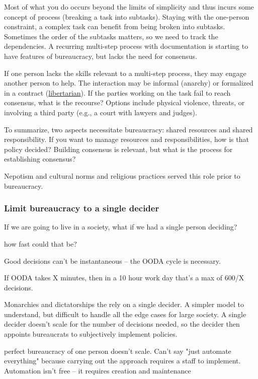 Most of what you do occurs beyond the limits of simplicity and thus incurs some concept of \gls{process} (breaking a task into subtasks). Staying with the one-person constraint, a complex task can benefit from being broken into subtasks. Sometimes the order of the subtasks matters, so we need to track the dependencies. A recurring multi-step process with documentation is starting to have features of bureaucracy, but lacks the need for consensus. 


If one person lacks the skills relevant to a multi-step process, they may engage another person to help. The interaction may be informal (anarchy) or formalized in a contract (\href{https://en.wikipedia.org/wiki/Libertarianism}{libertarian}). If the parties working on the task fail to reach consensus, what is the recourse? Options include physical violence, threats, or involving a third party (e.g., a court with lawyers and judges). 


To summarize, two aspects necessitate bureaucracy: shared resources and shared responsibility. 
If you want to manage resources and responsibilities, how is that policy decided?  Building consensus is relevant, but what is the process for establishing consensus?

Nepotism and cultural norms and religious practices served this role prior to bureaucracy. 


\subsubsection{Limit bureaucracy to a single decider}
If we are going to live in a society, what if we had a single person deciding?

how fast could that be?

Good decisions can't be instantaneous -- the OODA cycle is necessary.

If OODA takes X minutes, then in a 10 hour work day that's a max of 600/X decisions.



Monarchies and dictatorships the rely on a single decider. A simpler model to understand, but difficult to handle all the edge cases for large society. A single decider doesn't scale for the number of decisions needed, so the decider then appoints bureaucrats to subjectively implement policies. 


perfect bureaucracy of one person doesn't scale. Can't say "just automate everything" because carrying out the approach requires a staff to implement. Automation isn't free -- it requires creation and maintenance

